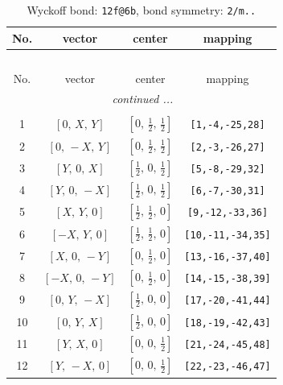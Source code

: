 \documentclass[fleqn,8pt]{jsarticle}
\begin{document}
\renewcommand{\arraystretch}{1.2}
\begin{longtable}{cccc}
\caption{Wyckoff bond: {\tt 12f@6b}, bond symmetry: {\tt 2/m..}}
 \\
 \hline \hline
No. & vector & center & mapping \\ \hline \endfirsthead

\multicolumn{3}{l}{\tablename\ \thetable{}} \\
 \hline \hline
No. & vector & center & mapping \\ \hline \endhead

 \hline \hline
\multicolumn{3}{r}{\footnotesize\it continued ...} \\ \endfoot

 \hline \hline
\multicolumn{3}{r}{} \\ \endlastfoot

1 & $\left[ 0,\, X,\, Y \right]$ & $\left[ 0,\, \frac{1}{2},\, \frac{1}{2} \right]$ & {\tt [1,-4,-25,28]} \\ \hline
2 & $\left[ 0,\, - X,\, Y \right]$ & $\left[ 0,\, \frac{1}{2},\, \frac{1}{2} \right]$ & {\tt [2,-3,-26,27]} \\ \hline
3 & $\left[ Y,\, 0,\, X \right]$ & $\left[ \frac{1}{2},\, 0,\, \frac{1}{2} \right]$ & {\tt [5,-8,-29,32]} \\ \hline
4 & $\left[ Y,\, 0,\, - X \right]$ & $\left[ \frac{1}{2},\, 0,\, \frac{1}{2} \right]$ & {\tt [6,-7,-30,31]} \\ \hline
5 & $\left[ X,\, Y,\, 0 \right]$ & $\left[ \frac{1}{2},\, \frac{1}{2},\, 0 \right]$ & {\tt [9,-12,-33,36]} \\ \hline
6 & $\left[ - X,\, Y,\, 0 \right]$ & $\left[ \frac{1}{2},\, \frac{1}{2},\, 0 \right]$ & {\tt [10,-11,-34,35]} \\ \hline
7 & $\left[ X,\, 0,\, - Y \right]$ & $\left[ 0,\, \frac{1}{2},\, 0 \right]$ & {\tt [13,-16,-37,40]} \\ \hline
8 & $\left[ - X,\, 0,\, - Y \right]$ & $\left[ 0,\, \frac{1}{2},\, 0 \right]$ & {\tt [14,-15,-38,39]} \\ \hline
9 & $\left[ 0,\, Y,\, - X \right]$ & $\left[ \frac{1}{2},\, 0,\, 0 \right]$ & {\tt [17,-20,-41,44]} \\ \hline
10 & $\left[ 0,\, Y,\, X \right]$ & $\left[ \frac{1}{2},\, 0,\, 0 \right]$ & {\tt [18,-19,-42,43]} \\ \hline
11 & $\left[ Y,\, X,\, 0 \right]$ & $\left[ 0,\, 0,\, \frac{1}{2} \right]$ & {\tt [21,-24,-45,48]} \\ \hline
12 & $\left[ Y,\, - X,\, 0 \right]$ & $\left[ 0,\, 0,\, \frac{1}{2} \right]$ & {\tt [22,-23,-46,47]} \\
\end{longtable}
\end{document}
